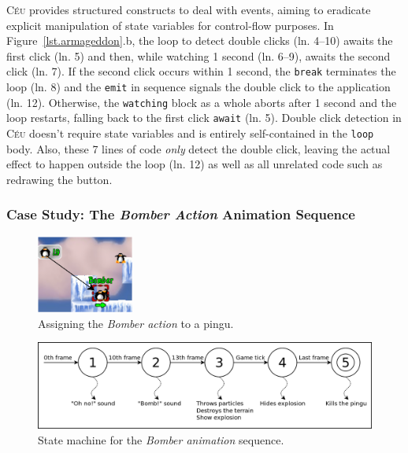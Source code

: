 \documentclass{vgtc}                          %
\newcommand{\CEU}{\textsc{C\'{e}u}\xspace}
\newcommand{\code}[1] {{\small{\texttt{#1}}}}
\begin{document}
\CEU provides structured constructs to deal with events, aiming to eradicate
explicit manipulation of state variables for control-flow purposes.
%
In Figure~\ref{lst.armageddon}.b, the loop to detect double clicks (ln. 4--10)
awaits the first click (ln. 5) and then, while watching 1 second (ln. 6--9),
awaits the second click (ln. 7).
If the second click occurs within 1 second, the \code{break} terminates the
loop (ln. 8) and the \code{emit} in sequence signals the double click to the
application (ln. 12).
Otherwise, the \code{watching} block as a whole aborts after 1 second  and the
loop restarts, falling back to the first click \code{await} (ln. 5).
%
Double click detection in \CEU doesn't require state variables and is entirely
self-contained in the \code{loop} body.
Also, these 7 lines of code \emph{only} detect the double click, leaving the
actual effect to happen outside the loop (ln. 12) as well as all unrelated
code such as redrawing the button.

\subsubsection{Case Study: The \emph{Bomber Action} Animation Sequence}
\label{sec.pats.fsms.2}


\begin{figure}[t]
\centering
\includegraphics[width=120px]{bomber-01}
\caption{ Assigning the \emph{Bomber action} to a pingu.
\label{fig.bomber.action}
}
\end{figure}

\begin{figure}[t]
\centering
\includegraphics[width=\columnwidth]{states}
\caption{ State machine for the \emph{Bomber animation} sequence.
\label{fig.bomber.fsm}
}
\end{figure}
\end{document}
